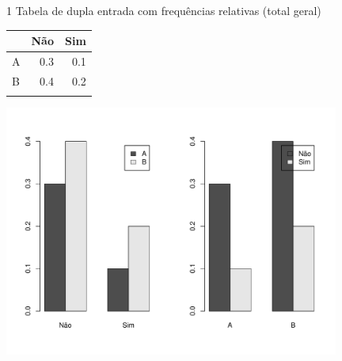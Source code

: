 \documentclass[
  ignorenonframetext,
  serif,
  professionalfont,
  usenames,
  dvipsnames,
  aspectratio = 169]{beamer}
\def\beginAThirdColumn{\begin{minipage}{0.31\textwidth}}%
\def\beginTwoThirdsColumn{\begin{minipage}{0.64\textwidth}}%
\def\endColumns{\end{minipage}}%
\begin{document}
\begin{frame}{1 Tabela de dupla entrada com frequências relativas (total
geral)}
\label{tabela-de-dupla-entrada-com-frequuxeancias-relativas-total-geral}
\beginAThirdColumn

\begin{longtable}[]{@{}lrr@{}}
\toprule\noalign{}
& Não & Sim \\
\midrule\noalign{}
\endhead
A & 0.3 & 0.1 \\
B & 0.4 & 0.2 \\
\bottomrule\noalign{}
\end{longtable}

\endColumns
\beginTwoThirdsColumn

\begin{center}\includegraphics[width=11cm]{exercicios-encontro2-solucao_files/figure-beamer/unnamed-chunk-18-1} \end{center}

\endColumns
\end{frame}
\end{document}
